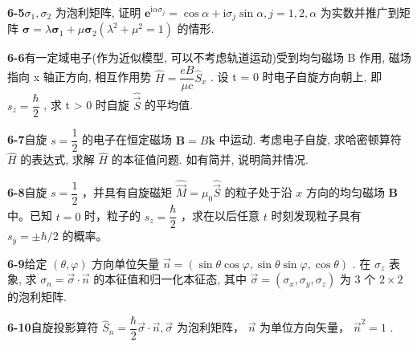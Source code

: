 \vfill

\newpage

\textbf{6-5}\quad $\displaystyle \sigma_{1},\sigma_{2}$ 为泡利矩阵, 证明 $\displaystyle \mathbf{e}^{\mathrm{i}\alpha \sigma_j} = \cos \alpha +\mathrm{i}\sigma_j\sin \alpha ,j = 1,2,\alpha$ 为实数并推广到矩阵 $\displaystyle \pmb {\sigma} = \lambda \pmb{\sigma}_{1} + \mu \pmb{\sigma}_{2}(\lambda^{2} + \mu^{2} = 1)$ 的情形.

\vfill

\newpage

\textbf{6-6}\quad 有一定域电子(作为近似模型, 可以不考虑轨道运动)受到均匀磁场 B 作用, 磁场指向 x 轴正方向, 相互作用势 $\displaystyle \hat{H} = \dfrac{eB}{\mu c} \hat{S}_{x}$ . 设 t = 0 时电子自旋方向朝上, 即 $\displaystyle s_{z} = \dfrac{\hbar}{2}$ , 求 t > 0 时自旋 $\displaystyle \hat{\vec{S}}$ 的平均值.

\vfill

\newpage

\textbf{6-7}\quad 自旋 $\displaystyle s = \dfrac{1}{2}$ 的电子在恒定磁场 $\displaystyle \pmb{B} = B\pmb{k}$ 中运动. 考虑电子自旋, 求哈密顿算符 $\displaystyle \hat{H}$ 的表达式, 求解 $\displaystyle \hat{H}$ 的本征值问题. 如有简并, 说明简并情况.

\vfill

\newpage

\textbf{6-8}\quad 自旋 $\displaystyle s = \dfrac{1}{2}$ ，并具有自旋磁矩 $\displaystyle \hat{\vec{M}} = \mu_0\hat{\vec{S}}$ 的粒子处于沿 $\displaystyle x$ 方向的均匀磁场 $\displaystyle \pmb{B}$ 中。已知 $\displaystyle t = 0$ 时，粒子的 $\displaystyle s_z = \dfrac{\hbar}{2}$ ，求在以后任意 $\displaystyle t$ 时刻发现粒子具有 $\displaystyle s_y = \pm \hbar / 2$ 的概率。

\vfill

\newpage

\textbf{6-9}\quad 给定 $\displaystyle (\theta, \varphi)$ 方向单位矢量 $\displaystyle \vec{n} = (\sin \theta \cos \varphi, \sin \theta \sin \varphi, \cos \theta)$ . 在 $\displaystyle \sigma_z$ 表象, 求 $\displaystyle \sigma_n = \vec{\sigma} \cdot \vec{n}$ 的本征值和归一化本征态, 其中 $\displaystyle \vec{\sigma} = (\sigma_x, \sigma_y, \sigma_z)$ 为 3 个 $\displaystyle 2 \times 2$ 的泡利矩阵.

\vfill

\newpage

\textbf{6-10}\quad 自旋投影算符 $\displaystyle \hat{S}_n = \dfrac{\hbar}{2}\vec{\sigma} \cdot \vec{n}, \vec{\sigma}$ 为泡利矩阵， $\displaystyle \vec{n}$ 为单位方向矢量， $\displaystyle \vec{n}^{2} = 1$ .

